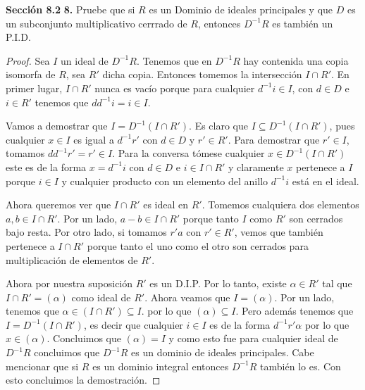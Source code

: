 \documentclass[letter,twoside,12pt]{article}
\begin{document}
\newpage \textbf{Sección 8.2} \textbf{8.} Pruebe que si $ R $ es un Dominio de ideales principales y que $ D $ es un subconjunto multiplicativo cerrrado de $ R $, entonces $ D^{-1}R $ es también un P.I.D.
\begin{proof}

Sea $I$ un ideal de $ D^{-1}R $. Tenemos que en $D^{-1}R$ hay contenida una copia isomorfa de $R$, sea $ R' $ dicha copia. Entonces tomemos la intersección $ I \cap R' $. En primer lugar, $ I \cap R' $ nunca es vacío porque para cualquier $ d^{-1}i \in I$, con $d \in D$ e $i \in R'$ tenemos que $dd^{-1}i = i \in I$.

Vamos a demostrar que $I = D^{-1}( I \cap R')$. Es claro que $ I \subseteq D^{-1}( I \cap R')$, pues cualquier $x \in I$ es igual a $d^{-1}r'$ con $d \in D$ y $ r' \in R' $. Para demostrar que $r' \in I$, tomamos $dd^{-1}r'=r' \in I$. Para la conversa tómese cualquier $x \in D^{-1}(I \cap R')$ este es de la forma $ x = d^{-1}i$ con $ d \in D $ e $ i \in I \cap R' $ y claramente $ x $ pertenece a $ I $ porque $i \in I$ y cualquier producto con un elemento del anillo $d^{-1}i$ está en el ideal.

Ahora queremos ver que $I \cap R'$ es ideal en $R'$. Tomemos cualquiera dos elementos $a,b \in I \cap R'$. Por un lado, $ a-b \in I \cap R'$ porque tanto $I$ como $R'$ son cerrados bajo resta. Por otro lado, si tomamos $r'a$ con $r' \in R'$, vemos que también pertenece a $I \cap R'$ porque tanto el uno como el otro son cerrados para multiplicación de elementos de $R'$.

Ahora por nuestra suposición $R'$ es un D.I.P. Por lo tanto, existe $\alpha \in R'$ tal que $ I \cap R' = (\alpha)$ como ideal de $R'$. Ahora veamos que $I = (\alpha)$. Por un lado, tenemos que $\alpha \in (I \cap R') \subseteq I$. por lo que $(\alpha) \subseteq I$. Pero además tenemos que $I = D^{-1}( I \cap R')$, es decir que cualquier $i \in I$ es de la forma $d^{-1}r'\alpha$ por lo que $x \in (\alpha)$. Concluimos que $(\alpha) = I$ y como esto fue para cualquier ideal de $D^{-1}R$ concluimos que $D^{-1}R$ es un dominio de ideales principales. Cabe mencionar que si $R$ es un dominio integral entonces $D^{-1}R$ también lo es. Con esto concluimos la demostración.
\end{proof}
\end{document}

